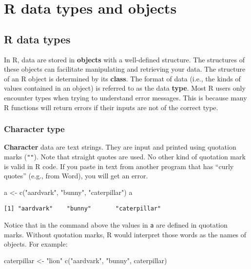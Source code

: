 \documentclass[
  13,
  letterpaper,
]{report}
\newenvironment{Shaded}{\begin{snugshade}}{\end{snugshade}}
\newcommand{\FunctionTok}[1]{\textcolor[rgb]{0.28,0.35,0.67}{#1}}
\newcommand{\NormalTok}[1]{\textcolor[rgb]{0.00,0.23,0.31}{#1}}
\newcommand{\OtherTok}[1]{\textcolor[rgb]{0.00,0.23,0.31}{#1}}
\newcommand{\StringTok}[1]{\textcolor[rgb]{0.13,0.47,0.30}{#1}}
\begin{document}
\chapter{R data types and objects}\label{sec-03}

\section{R data types}\label{sec-03-type}

In R, data are stored in \textbf{objects} with a well-defined structure.
The structures of these objects can facilitate manipulating and
retrieving your data. The structure of an R object is determined by its
\textbf{class}. The format of data (i.e., the kinds of values contained
in an object) is referred to as the data \textbf{type}. Most R users
only encounter types when trying to understand error messages. This is
because many R functions will return errors if their inputs are not of
the correct type.

\subsection{Character type}\label{character-type}

\textbf{Character} data are text strings. They are input and printed
using quotation marks (\texttt{""}). Note that straight quotes are used.
No other kind of quotation mark is valid in R code. If you paste in text
from another program that has ``curly quotes'' (e.g., from Word), you
will get an error.

\begin{Shaded}
\begin{Highlighting}[]
\NormalTok{a }\OtherTok{\textless{}{-}} \FunctionTok{c}\NormalTok{(}\StringTok{"aardvark"}\NormalTok{, }\StringTok{"bunny"}\NormalTok{, }\StringTok{"caterpillar"}\NormalTok{)}
\NormalTok{a}
\end{Highlighting}
\end{Shaded}

\begin{verbatim}
[1] "aardvark"    "bunny"       "caterpillar"
\end{verbatim}

Notice that in the command above the values in \texttt{a} are defined in
quotation marks. Without quotation marks, R would interpret those words
as the names of objects. For example:

\begin{Shaded}
\begin{Highlighting}[]
\NormalTok{caterpillar }\OtherTok{\textless{}{-}} \StringTok{"lion"}
\FunctionTok{c}\NormalTok{(}\StringTok{"aardvark"}\NormalTok{, }\StringTok{"bunny"}\NormalTok{, caterpillar)}
\end{Highlighting}
\end{Shaded}
\end{document}
